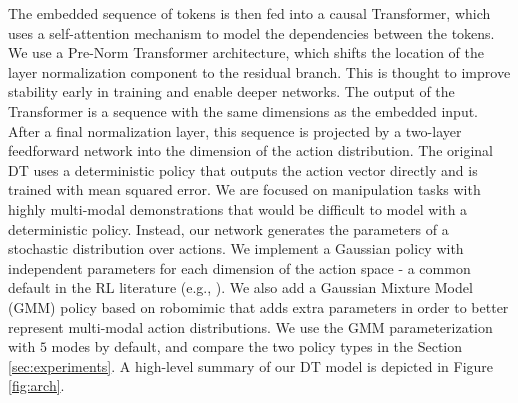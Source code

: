  The embedded sequence of tokens is then fed into a causal Transformer, which uses a self-attention mechanism to model the dependencies between the tokens. We use a Pre-Norm Transformer \cite{xiong2020layer} architecture, which shifts the location of the layer normalization component to the residual branch. This is thought to improve stability early in training and enable deeper networks. The output of the Transformer is a sequence with the same dimensions as the embedded input. After a final normalization layer, this sequence is projected by a two-layer feedforward network into the dimension of the action distribution. The original DT uses a deterministic policy that outputs the action vector directly and is trained with mean squared error. We are focused on manipulation tasks with highly multi-modal demonstrations that would be difficult to model with a deterministic policy. Instead, our network generates the parameters of a stochastic distribution over actions. We implement a Gaussian policy with independent parameters for each dimension of the action space - a common default in the RL literature (e.g., \cite{schulman2017proximal, haarnoja2018soft}). We also add a Gaussian Mixture Model (GMM) policy based on robomimic that adds extra parameters in order to better represent multi-modal action distributions. We use the GMM parameterization with $5$ modes by default, and compare the two policy types in the Section \ref{sec:experiments}. A high-level summary of our DT model is depicted in Figure \ref{fig:arch}.
 
 




